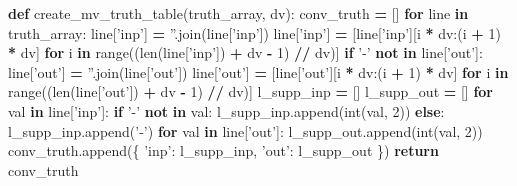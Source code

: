 \documentclass[]{book}
\newenvironment{Shaded}{\begin{snugshade}}{\end{snugshade}}
\newcommand{\BuiltInTok}[1]{#1}
\newcommand{\ControlFlowTok}[1]{\textcolor[rgb]{0.13,0.29,0.53}{\textbf{#1}}}
\newcommand{\DecValTok}[1]{\textcolor[rgb]{0.00,0.00,0.81}{#1}}
\newcommand{\KeywordTok}[1]{\textcolor[rgb]{0.13,0.29,0.53}{\textbf{#1}}}
\newcommand{\NormalTok}[1]{#1}
\newcommand{\OperatorTok}[1]{\textcolor[rgb]{0.81,0.36,0.00}{\textbf{#1}}}
\newcommand{\StringTok}[1]{\textcolor[rgb]{0.31,0.60,0.02}{#1}}
\begin{document}
\begin{Shaded}
\begin{Highlighting}[]
\KeywordTok{def}\NormalTok{ create_mv_truth_table(truth_array, dv):}
\NormalTok{  conv_truth }\OperatorTok{=}\NormalTok{ []}
  \ControlFlowTok{for}\NormalTok{ line }\KeywordTok{in}\NormalTok{ truth_array:}
\NormalTok{    line[}\StringTok{'inp'}\NormalTok{] }\OperatorTok{=} \StringTok{''}\NormalTok{.join(line[}\StringTok{'inp'}\NormalTok{])}
\NormalTok{    line[}\StringTok{'inp'}\NormalTok{] }\OperatorTok{=}\NormalTok{ [line[}\StringTok{'inp'}\NormalTok{][i }\OperatorTok{*}\NormalTok{ dv:(i }\OperatorTok{+} \DecValTok{1}\NormalTok{) }\OperatorTok{*}\NormalTok{ dv]}
      \ControlFlowTok{for}\NormalTok{ i }\KeywordTok{in} \BuiltInTok{range}\NormalTok{((}\BuiltInTok{len}\NormalTok{(line[}\StringTok{'inp'}\NormalTok{]) }\OperatorTok{+}\NormalTok{ dv }\OperatorTok{-} \DecValTok{1}\NormalTok{) }\OperatorTok{//}\NormalTok{ dv)]}
    \ControlFlowTok{if} \StringTok{'-'} \KeywordTok{not} \KeywordTok{in}\NormalTok{ line[}\StringTok{'out'}\NormalTok{]:}
\NormalTok{      line[}\StringTok{'out'}\NormalTok{] }\OperatorTok{=} \StringTok{''}\NormalTok{.join(line[}\StringTok{'out'}\NormalTok{])}
\NormalTok{      line[}\StringTok{'out'}\NormalTok{] }\OperatorTok{=}\NormalTok{ [line[}\StringTok{'out'}\NormalTok{][i }\OperatorTok{*}\NormalTok{ dv:(i }\OperatorTok{+} \DecValTok{1}\NormalTok{) }\OperatorTok{*}\NormalTok{ dv]}
        \ControlFlowTok{for}\NormalTok{ i }\KeywordTok{in} \BuiltInTok{range}\NormalTok{((}\BuiltInTok{len}\NormalTok{(line[}\StringTok{'out'}\NormalTok{]) }\OperatorTok{+}\NormalTok{ dv }\OperatorTok{-} \DecValTok{1}\NormalTok{) }\OperatorTok{//}\NormalTok{ dv)]}
\NormalTok{      l_supp_inp }\OperatorTok{=}\NormalTok{ []}
\NormalTok{      l_supp_out }\OperatorTok{=}\NormalTok{ []}
      \ControlFlowTok{for}\NormalTok{ val }\KeywordTok{in}\NormalTok{ line[}\StringTok{'inp'}\NormalTok{]:}
        \ControlFlowTok{if} \StringTok{'-'} \KeywordTok{not} \KeywordTok{in}\NormalTok{ val:}
\NormalTok{          l_supp_inp.append(}\BuiltInTok{int}\NormalTok{(val, }\DecValTok{2}\NormalTok{))}
        \ControlFlowTok{else}\NormalTok{:}
\NormalTok{          l_supp_inp.append(}\StringTok{'-'}\NormalTok{)}
      \ControlFlowTok{for}\NormalTok{ val }\KeywordTok{in}\NormalTok{ line[}\StringTok{'out'}\NormalTok{]:}
\NormalTok{        l_supp_out.append(}\BuiltInTok{int}\NormalTok{(val, }\DecValTok{2}\NormalTok{))}
\NormalTok{      conv_truth.append(\{}
        \StringTok{'inp'}\NormalTok{:  l_supp_inp,}
        \StringTok{'out'}\NormalTok{:  l_supp_out}
\NormalTok{      \})}
  \ControlFlowTok{return}\NormalTok{ conv_truth}
\end{Highlighting}
\end{Shaded}
\end{document}
